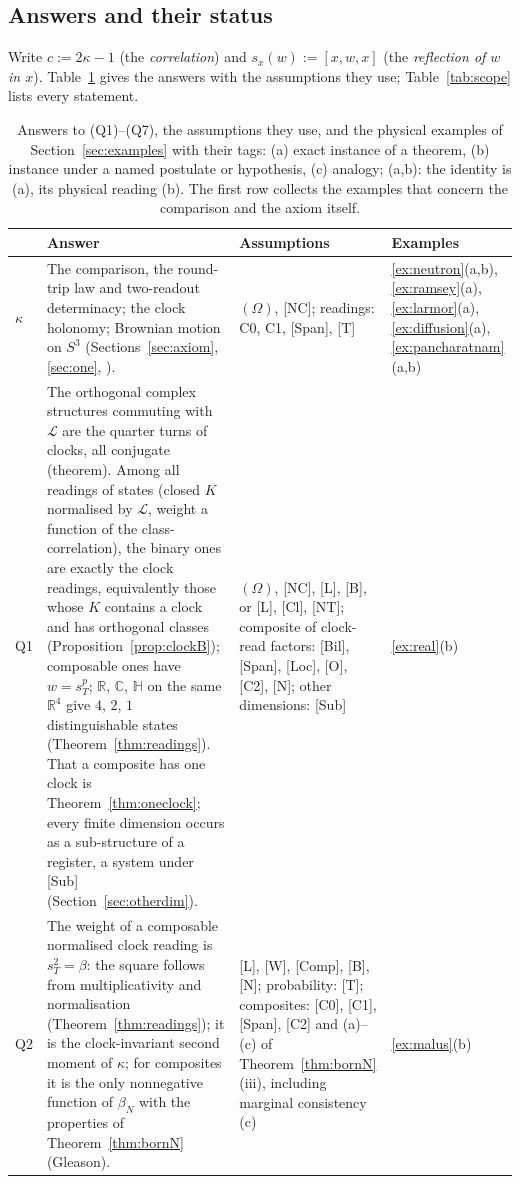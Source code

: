 \documentclass[aps,pra,onecolumn,superscriptaddress,nofootinbib,10pt]{revtex4-2}
\theoremstyle{definition}
\theoremstyle{remark}
\newcommand{\R}{\mathbb{R}}
\newcommand{\C}{\mathbb{C}}
\newcommand{\HH}{\mathbb{H}}
\newcommand{\cL}{\mathcal{L}}
\newcommand{\hp}[3]{[#1,#2,#3]}
\newcommand{\PI}{\cite{PaperI}}
\begin{document}
\subsection{Answers and their status}
Write $c:=2\kappa-1$ (the \emph{correlation}) and $s_x(w):=\hp{x}{w}{x}$ (the \emph{reflection of $w$ in
$x$}).  Table~\ref{tab:answers} gives the answers with the assumptions they use;
Table~\ref{tab:scope} lists every statement.

\begin{table}[h]
\caption{Answers to (Q1)--(Q7), the assumptions they use, and the physical examples of Section~\ref{sec:examples}
with their tags: (a) exact instance of a theorem, (b) instance under a named postulate or hypothesis,
(c) analogy; (a,b): the identity is (a), its physical reading (b).  The first row collects the examples
that concern the comparison and the axiom itself.}
\label{tab:answers}
\footnotesize
\begin{tabular}{@{}p{}p{}p{}p{}@{}}
\toprule
& Answer & Assumptions & Examples\\
\midrule
$\kappa$ & The comparison, the round-trip law and two-readout determinacy; the clock holonomy; Brownian motion on $S^3$ (Sections~\ref{sec:axiom}, \ref{sec:one}, \PI). & $(\Omega)$, [NC]; readings: C0, C1, [Span], [T] & \ref{ex:neutron}(a,b), \ref{ex:ramsey}(a), \ref{ex:larmor}(a), \ref{ex:diffusion}(a), \ref{ex:pancharatnam}(a,b)\\
Q1 & The orthogonal complex structures commuting with $\cL$ are the quarter turns of clocks, all conjugate (theorem).  Among all readings of states (closed $K$ normalised by $\cL$, weight a function of the class-correlation), the binary ones are exactly the clock readings, equivalently those whose $K$ contains a clock and has orthogonal classes (Proposition~\ref{prop:clockB}); composable ones have $w=s_T^p$; $\R$, $\C$, $\HH$ on the same $\R^4$ give $4$, $2$, $1$ distinguishable states (Theorem~\ref{thm:readings}).  That a composite has one clock is Theorem~\ref{thm:oneclock}; every finite dimension occurs as a sub-structure of a register, a system under [Sub] (Section~\ref{sec:otherdim}). & $(\Omega)$, [NC], [L], [B], or [L], [Cl], [NT]; composite of clock-read factors: [Bil], [Span], [Loc], [O], [C2], [N]; other dimensions: [Sub] & \ref{ex:real}(b)\\
Q2 & The weight of a composable normalised clock reading is $s_T^2=\beta$: the square follows from multiplicativity and normalisation (Theorem~\ref{thm:readings}); it is the clock-invariant second moment of $\kappa$; for composites it is the only nonnegative function of $\beta_N$ with the properties of Theorem~\ref{thm:bornN} (Gleason). & [L], [W], [Comp], [B], [N]; probability: [T]; composites: [C0], [C1], [Span], [C2] and (a)--(c) of Theorem~\ref{thm:bornN}(iii), including marginal consistency (c) & \ref{ex:malus}(b)\\

\end{tabular}
\end{table}
\end{document}
